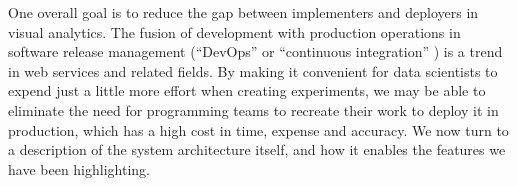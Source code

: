 One overall goal is to reduce the gap between implementers and
deployers in visual analytics. The fusion of development with
production operations in software release management (``DevOps''
\cite{Httermann:2012:DD} or ``continuous integration''
\cite{Fowler:2006:Continuous}) is a trend in web services and related
fields.  By making it convenient for data scientists to expend just a
little more effort when creating experiments, we may be able to
eliminate the need for programming teams to recreate their work to
deploy it in production, which has a high cost in time, expense and
accuracy. We now turn to a description of the system architecture
itself, and how it enables the features we have been highlighting.
